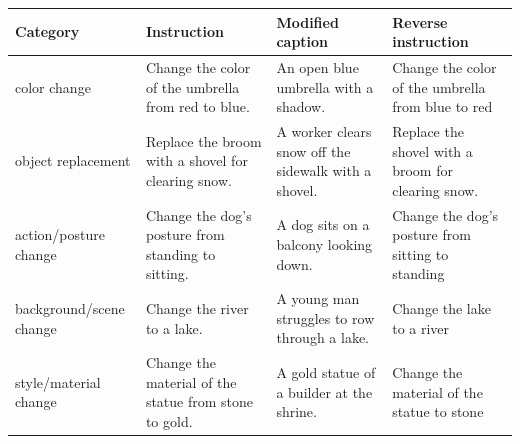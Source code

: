 \begin{tabular}{llll}
\toprule
Category & Instruction & Modified caption & Reverse instruction \\
\midrule
color change & Change the color of the umbrella from red to blue. & An open blue umbrella with a shadow. & Change the color of the umbrella from blue to red \\
object replacement & Replace the broom with a shovel for clearing snow. & A worker clears snow off the sidewalk with a shovel. & Replace the shovel with a broom for clearing snow. \\
action/posture change & Change the dog's posture from standing to sitting. & A dog sits on a balcony looking down. & Change the dog's posture from sitting to standing \\
background/scene change & Change the river to a lake. & A young man struggles to row through a lake. & Change the lake to a river \\
style/material change & Change the material of the statue from stone to gold. & A gold statue of a builder at the shrine. & Change the material of the statue to stone \\
\bottomrule
\end{tabular}

